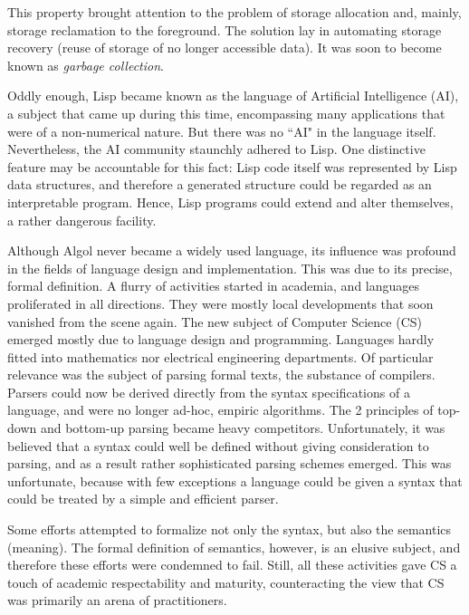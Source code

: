 This property brought attention to the problem of storage allocation and, mainly,
storage reclamation to the foreground. The solution lay in automating storage
recovery (reuse of storage of no longer accessible data). It was soon to become
known as \emph{garbage collection}.

Oddly enough, Lisp became known as the language of Artificial Intelligence (AI),
a subject that came up during this time, encompassing many applications that were
of a non-numerical nature. But there was no “AI" in the language itself.
Nevertheless, the AI community staunchly adhered to Lisp. One distinctive feature
may be accountable for this fact: Lisp code itself was represented by Lisp data
structures, and therefore a generated structure could be regarded as an
interpretable program. Hence, Lisp programs could extend and alter themselves,
a rather dangerous facility.

Although Algol never became a widely used language, its influence was profound
in the fields of language design and implementation. This was due to its precise,
formal definition. A flurry of activities started in academia, and languages
proliferated in all directions. They were mostly local developments that soon
vanished from the scene again. The new subject of Computer Science (CS) emerged
mostly due to language design and programming. Languages hardly fitted into
mathematics nor electrical engineering departments. Of particular relevance was
the subject of parsing formal texts, the substance of compilers. Parsers could
now be derived directly from the syntax specifications of a language, and were
no longer ad-hoc, empiric algorithms. The 2 principles of top-down and bottom-up
parsing became heavy competitors. Unfortunately, it was believed that a syntax
could well be defined without giving consideration to parsing, and as a result
rather sophisticated parsing schemes emerged. This was unfortunate, because with
few exceptions a language could be given a syntax that could be treated by a
simple and efficient parser.

Some efforts attempted to formalize not only the syntax, but also the semantics
(meaning). The formal definition of semantics, however, is an elusive subject,
and therefore these efforts were condemned to fail. Still, all these activities
gave CS a touch of academic respectability and maturity, counteracting the view
that CS was primarily an arena of practitioners.
